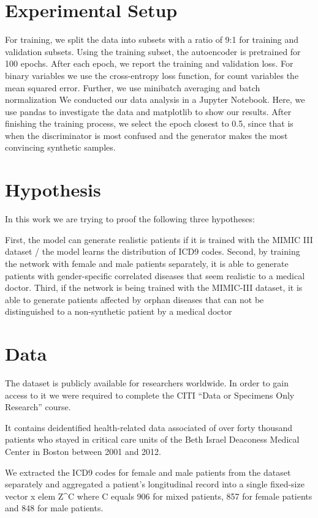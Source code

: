 \documentclass[11pt, a4paper]{book}
\begin{document}
\section{Experimental Setup}
 For training, we split the data into subsets with a ratio of 9:1 for training and validation subsets. Using the training subset, the autoencoder is pretrained for 100 epochs. 
 After each epoch, we report the training and validation loss. For binary variables we use the cross-entropy loss  function, for count variables the mean squared error.
 Further, we use minibatch averaging and batch normalization
We conducted our data analysis in a Jupyter Notebook. Here, we use pandas to investigate the data and matplotlib to show our results.
After finishing the training process, we select the epoch closest to 0.5, since that is when the discriminator is most confused and the generator makes the most convincing synthetic samples.


\section{Hypothesis}
In this work we are trying to proof the following three hypotheses:

First, the model can generate realistic patients if it is trained with the MIMIC III dataset / the model learns the distribution of ICD9 codes.
Second, by training the network with female and male patients separately, it is able to generate patients with gender-specific correlated diseases that seem realistic to a medical doctor.
Third, if the network is being trained with the MIMIC-III dataset, it is able to generate patients affected by orphan diseases that can not be distinguished to a non-synthetic patient by a medical doctor



\section{Data}
The dataset is publicly available for researchers worldwide. In order to gain access to it we were required to complete the CITI “Data or Specimens Only Research” course.

It contains deidentified health-related data associated of over forty thousand patients who stayed in critical care units of the Beth Israel Deaconess Medical Center in Boston between 2001 and 2012.

We extracted the ICD9 codes for female and male patients from the dataset separately and aggregated a patient’s longitudinal record into a single fixed-size vector  x elem Z{^C} where C equals 906 for mixed patients, 857 for female patients and 848 for male patients.
\end{document}
